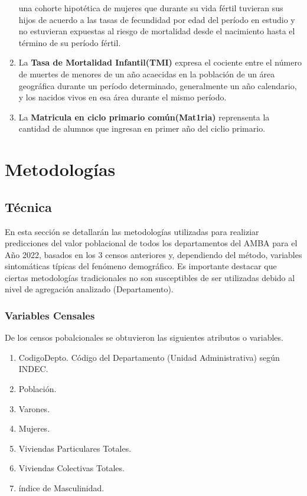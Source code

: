 \documentclass{article}
\theoremstyle{mytheoremstyle}
\theoremstyle{mytheoremstyle}
\theoremstyle{myproblemstyle}
\begin{document}
\begin{enumerate}
   una cohorte hipotética de mujeres que durante su vida fértil tuvieran sus hijos de acuerdo 
   a las tasas de fecundidad por edad del período en estudio y no estuvieran expuestas al
   riesgo de mortalidad desde el nacimiento hasta el término de su período fértil.
   \item La \textbf{Tasa de Mortalidad Infantil(TMI)} expresa el cociente entre el número de muertes de menores de un año acaecidas 
   en la población de un área geográfica durante un período determinado, 
   generalmente un año calendario, y los nacidos vivos en esa área durante el mismo período.
   \item La \textbf{Matricula en ciclo primario común(Mat1ria)} reprensenta la cantidad de alumnos
   que ingresan en primer año del ciclio primario.
\end{enumerate}

\section{Metodologías}
\subsection{Técnica}
En esta sección se detallarán las metodologías 
utilizadas para realiziar predicciones del valor poblacional de todos los 
departamentos del AMBA para el Año 2022, basados en los 3 censos anteriores y, dependiendo del método, variables sintomáticas
típicas del fenómeno demográfico. Es importante destacar que ciertas metodologías tradicionales
 no son susceptibles de ser utilizadas debido al nivel de agregación analizado (Departamento).\newline
 \subsubsection{Variables Censales}
 De los censos pobalcionales se obtuvieron las siguientes atributos o variables.
 \begin{enumerate}
  \item CodigoDepto. Código del Departamento (Unidad Administrativa) según INDEC.
  \item	Población.
  \item Varones.
  \item Mujeres.
  \item Viviendas Particulares Totales.
  \item Viviendas Colectivas Totales.
  \item índice de Masculinidad.
 \end{enumerate} 
\end{document}
